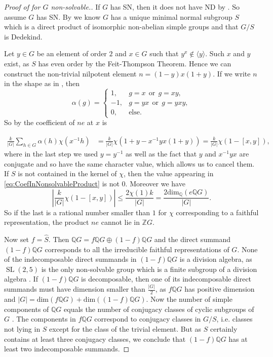\documentclass[a4paper,10pt]{amsart}
\theoremstyle{definition}
\theoremstyle{remark}
\begin{document}
\begin{proof}[Proof of  for $G$ non-solvable.]
If $G$ has SN, then it does not have ND by \cite[Proposition 3.4]{JespersSun}. So assume $G$ has SN. By  we know $G$ has a unique minimal normal subgroup $S$ which is a direct product of isomorphic non-abelian simple groups and that $G/S$ is Dedekind.

Let $y \in G$ be an element of order $2$ and $x \in G$ such that $y^x \notin \langle y \rangle$. Such $x$ and $y$ exist, as $S$ has even order by the Feit-Thompson Theorem. Hence we can construct the non-trivial nilpotent element $n = (1-y)x(1+y)$. If we write $n$ in the shape as in , then
\[\alpha(g) = \left\{ \begin{array}{lll} 1, & g = x \ \ \text{or} \ \ g = xy, \\  -1, & g = yx \ \ \text{or} \ \ g = yxy, \\ 0, & \text{else}. \end{array}\right. \]
So by  the coefficient of $ne$ at $x$ is

\begin{align}\label{eq:CoefInNonsolvableProduct} 
\frac{k}{|G|}\sum_{h \in G} \alpha(h) \chi(x^{-1}h) &= \frac{k}{|G|} \chi\left(1+y - x^{-1}yx(1+y)\right)  = \frac{k}{|G|} \chi\left(1-[x,y]\right),
\end{align}
where in the last step we used $y=y^{-1}$ as well as the fact that $y$ and $x^{-1}yx$ are conjugate and so have the same character value, which allows us to cancel them.
If $S$ is not contained in the kernel of $\chi$, then the value appearing in \eqref{eq:CoefInNonsolvableProduct} is not $0$. Moreover we have 
\[\left|\frac{k}{|G|} \chi\left(1-[x,y]\right)\right| \leq \frac{2\chi(1)k}{|G|} = \frac{2\text{dim}_\mathbb{Q}(e\mathbb{Q}G)}{|G|}.\]
So if the last is a rational number smaller than $1$ for $\chi$ corresponding to a faithful representation, the product $ne$ cannot lie in $\mathbb{Z}G$.

Now set $f = \widehat{S}$. Then $\mathbb{Q}G = f\mathbb{Q}G \oplus (1-f)\mathbb{Q}G$ and the direct summand $(1-f)\mathbb{Q}G$ corresponds to all the irreducible faithful representations of $G$. None of the indecomposable direct summands in $(1-f)\mathbb{Q}G$ is a division algebra, as $\operatorname{SL}(2,5)$ is the only non-solvable group which is a finite subgroup of a division algebra \cite[2.1.4]{ShirvaniWehrfritz}. If $(1-f)\mathbb{Q}G$ is decomposable, then one of its indecomposable direct summands must have dimension smaller than $\frac{|G|}{2}$, as $f\mathbb{Q}G$ has positive dimension and $|G| = \text{dim}(f\mathbb{Q}G) + \text{dim}((1-f)\mathbb{Q}G)$. Now the number of simple components of $\mathbb{Q}G$ equals the number of conjugacy classes of cyclic subgroups of $G$ \cite[Corollary 7.1.12]{GRG1}. The components in $f\mathbb{Q}G$ correspond to conjugacy classes in $G/S$, i.e. classes not lying in $S$ except for the class of the trivial element. But as $S$ certainly contains at least three conjugacy classes, we conclude that $(1-f)\mathbb{Q}G$ has at least two indecomposable summands.
\end{proof}
\end{document}
